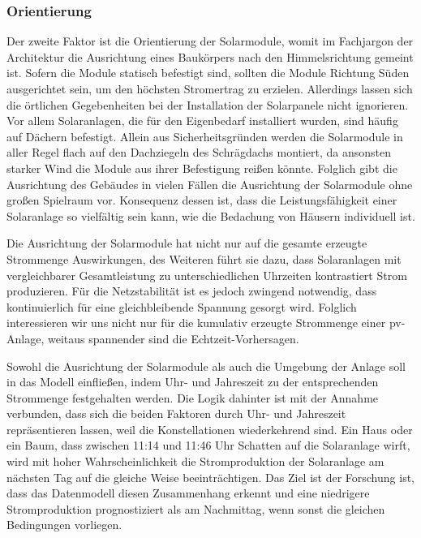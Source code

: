 \documentclass[12pt, a4paper]{article}
\begin{document}
\subsubsection{Orientierung}

Der zweite Faktor ist die Orientierung der Solarmodule, womit im Fachjargon der Architektur die Ausrichtung eines Baukörpers nach den Himmelsrichtung gemeint ist. Sofern die Module statisch befestigt sind, sollten die Module Richtung Süden ausgerichtet sein, um den höchsten Stromertrag zu erzielen. Allerdings lassen sich die örtlichen Gegebenheiten bei der Installation der Solarpanele nicht ignorieren. Vor allem Solaranlagen, die für den Eigenbedarf installiert wurden, sind häufig auf Dächern befestigt. Allein aus Sicherheitsgründen werden die Solarmodule in aller Regel flach auf den Dachziegeln des Schrägdachs montiert, da ansonsten starker Wind die Module aus ihrer Befestigung reißen könnte. Folglich gibt die Ausrichtung des Gebäudes in vielen Fällen die Ausrichtung der Solarmodule ohne großen Spielraum vor. Konsequenz dessen ist, dass die Leistungsfähigkeit einer Solaranlage so vielfältig sein kann, wie die Bedachung von Häusern individuell ist.

Die Ausrichtung der Solarmodule hat nicht nur auf die gesamte erzeugte Strommenge Auswirkungen, des Weiteren führt sie dazu, dass Solaranlagen mit vergleichbarer Gesamtleistung zu unterschiedlichen Uhrzeiten kontrastiert Strom produzieren. Für die Netzstabilität ist es jedoch zwingend notwendig, dass kontinuierlich für eine gleichbleibende Spannung gesorgt wird. Folglich interessieren wir uns nicht nur für die kumulativ erzeugte Strommenge einer \ac{pv}-Anlage, weitaus spannender sind die Echtzeit-Vorhersagen. 

Sowohl die Ausrichtung der Solarmodule als auch die Umgebung der Anlage soll in das Modell einfließen, indem Uhr- und Jahreszeit zu der entsprechenden Strommenge festgehalten werden. Die Logik dahinter ist mit der Annahme verbunden, dass sich die beiden Faktoren durch Uhr- und Jahreszeit repräsentieren lassen, weil die Konstellationen wiederkehrend sind. Ein Haus oder ein Baum, dass zwischen 11:14 und 11:46 Uhr Schatten auf die Solaranlage wirft, wird mit hoher Wahrscheinlichkeit die Stromproduktion der Solaranlage am nächsten Tag auf die gleiche Weise beeinträchtigen. Das Ziel ist der Forschung ist, dass das Datenmodell diesen Zusammenhang erkennt und eine niedrigere Stromproduktion prognostiziert als am Nachmittag, wenn sonst die gleichen Bedingungen vorliegen.
\end{document}
